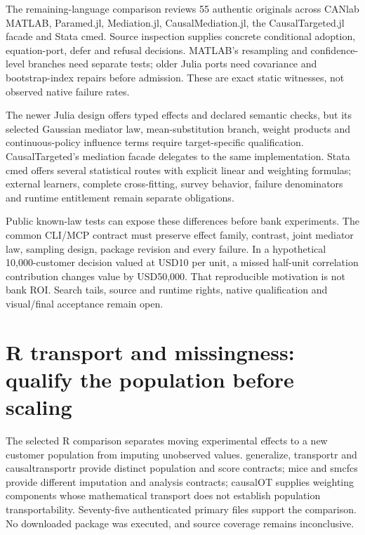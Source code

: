 The remaining-language comparison reviews 55 authentic originals across
CANlab MATLAB, Paramed.jl, Mediation.jl, CausalMediation.jl, the
CausalTargeted.jl facade and Stata cmed. Source inspection supplies
concrete conditional adoption, equation-port, defer and refusal
decisions. MATLAB's resampling and confidence-level branches need
separate tests; older Julia ports need covariance and bootstrap-index
repairs before admission. These are exact static witnesses, not observed
native failure rates.
\citep{exec25_omed_canlab,exec25_omed_paramed,exec25_omed_mediationjl}

The newer Julia design offers typed effects and declared semantic
checks, but its selected Gaussian mediator law, mean-substitution
branch, weight products and continuous-policy influence terms require
target-specific qualification. CausalTargeted's mediation facade
delegates to the same implementation. Stata cmed offers several
statistical routes with explicit linear and weighting formulas; external
learners, complete cross-fitting, survey behavior, failure denominators
and runtime entitlement remain separate obligations.
\citep{exec25_omed_causalmediation,exec25_omed_targeted,exec25_omed_cmedstata}

Public known-law tests can expose these differences before bank
experiments. The common CLI/MCP contract must preserve effect family,
contrast, joint mediator law, sampling design, package revision and
every failure. In a hypothetical 10,000-customer decision valued at
USD10 per unit, a missed half-unit correlation contribution changes
value by USD50,000. That reproducible motivation is not bank ROI. Search
tails, source and runtime rights, native qualification and visual/final
acceptance remain open. \citep{exec25_omed_choice}

\hypertarget{r-transport-and-missingness-qualify-the-population-before-scaling}{%
\section{R transport and missingness: qualify the population before
scaling}\label{r-transport-and-missingness-qualify-the-population-before-scaling}}

The selected R comparison separates moving experimental effects to a new
customer population from imputing unobserved values. generalize,
transportr and causaltransportr provide distinct population and score
contracts; mice and smcfcs provide different imputation and analysis
contracts; causalOT supplies weighting components whose mathematical
transport does not establish population transportability. Seventy-five
authenticated primary files support the comparison. No downloaded
package was executed, and source coverage remains inconclusive.
\citep{exec25_rtm_generalize,exec25_rtm_transportr,exec25_rtm_causaltransportr,exec25_rtm_mice,exec25_rtm_smcfcs,exec25_rtm_causalOT}


